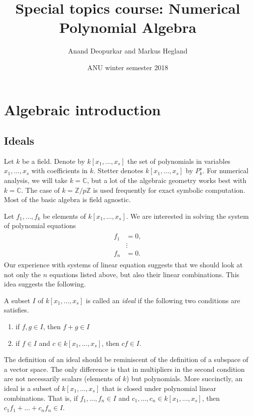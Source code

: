 \documentclass[11pt]{article}
\title{Special topics course: Numerical Polynomial Algebra}
\author{Anand Deopurkar and Markus Hegland}
\date{ANU winter semester 2018}
\newcommand{\C}{\mathbb C}
\newcommand{\Z}{\mathbb Z}
\begin{document}
\maketitle

\section{Algebraic introduction}

\subsection{Ideals}

Let $k$ be a field. Denote by $k[x_1,\dots,x_s]$ the set of polynomials in variables $x_1, \dots, x_s$ with coefficients in $k$. 
Stetter denotes $k[x_1,\dots,x_s]$ by $P^s_k$.
For numerical analysis, we will take $k = \C$, but a lot of the algebraic geometry works best with $k = \C$.
The case of $k = \Z/p\Z$ is used frequently for exact symbolic computation.
Most of the basic algebra is field agnostic.

Let $f_1, \dots, f_k$ be elements of $k[x_1,\dots, x_s]$.
We are interested in solving the system of polynomial equations
\begin{align}\label{eqn:system}
  \begin{split}
  f_1 &= 0,\\
  &\vdots\\
  f_n &= 0.
\end{split}
\end{align}
Our experience with systems of linear equation suggests that we should look at not only the $n$ equations listed above, but also their linear combinations.
This idea suggests the following.
\begin{definition}[Ideal]
  A subset $I$ of $k[x_1, \dots, x_s]$ is called an \emph{ideal} if the following two conditions are satisfies.
  \begin{enumerate}
  \item if $f, g \in I$, then $f+g \in I$
  \item if $f \in I$ and $c \in k[x_1, \dots, x_s]$, then $cf \in I$.
  \end{enumerate}
\end{definition}
The definition of an ideal should be reminiscent of the definition of a subspace of a vector space.
The only difference is that in multipliers in the second condition are not necessarily scalars (elements of $k$) but polynomials.
More succinctly, an ideal is a subset of $k[x_1, \dots, x_s]$ that is closed under polynomial linear combinations.
That is, if $f_1, \dots, f_n \in I$ and $c_1, \dots, c_n \in k[x_1, \dots, x_s]$, then $c_1f_1 + \dots + c_nf_n \in I$.
\end{document}
